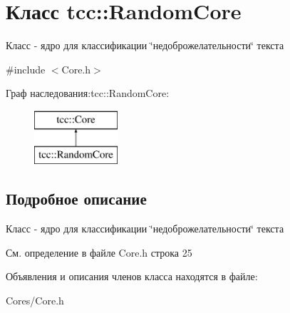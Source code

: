 \hypertarget{classtcc_1_1_random_core}{}\section{Класс tcc\+:\+:Random\+Core}
\label{classtcc_1_1_random_core}


Класс -\/ ядро для классификации \char`\"{}недоброжелательности\char`\"{} текста  




{\ttfamily \#include $<$Core.\+h$>$}

Граф наследования\+:tcc\+:\+:Random\+Core\+:\begin{figure}[H]
\begin{center}
\leavevmode
\includegraphics[height=2.000000cm]{classtcc_1_1_random_core}
\end{center}
\end{figure}


\subsection{Подробное описание}
Класс -\/ ядро для классификации \char`\"{}недоброжелательности\char`\"{} текста 

См. определение в файле Core.\+h строка 25



Объявления и описания членов класса находятся в файле\+:\begin{DoxyCompactItemize}
\item 
Cores/Core.\+h\end{DoxyCompactItemize}
